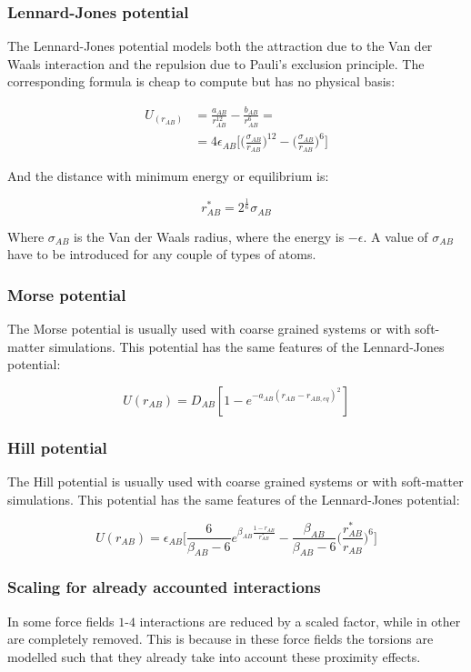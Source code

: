 		\subsubsection{Lennard-Jones potential}
		The Lennard-Jones potential models both the attraction due to the Van der Waals interaction and the repulsion due to Pauli's exclusion principle.
		The corresponding formula is cheap to compute but has no physical basis:

		\begin{align*}
			U_(r_{AB}) &= \frac{a_{AB}}{r^{12}_{AB}}-\frac{b_{AB}}{r^6_{AB}}=\\
								 &= 4\epsilon_{AB}\biggl[\biggl(\frac{\sigma_{AB}}{r_{AB}}\biggr)^{12}-\biggl(\frac{\sigma_{AB}}{r_{AB}}\biggr)^6\biggr]
		\end{align*}

		And the distance with minimum energy or equilibrium is:

		$$r^*_{AB} = 2^{\frac{1}{6}}\sigma_{AB}$$

		Where $\sigma_{AB}$ is the Van der Waals radius, where the energy is $-\epsilon$.
		A value of $\sigma_{AB}$ have to be introduced for any couple of types of atoms.

		\subsubsection{Morse potential}
		The Morse potential is usually used with coarse grained systems or with soft-matter simulations.
		This potential has the same features of the Lennard-Jones potential:

		$$U(r_{AB}) = D_{AB}[1-e^{-a_{AB}(r_{AB}-r_{AB,eq})^2}]$$

		\subsubsection{Hill potential}
		The Hill potential is usually used with coarse grained systems or with soft-matter simulations.
		This potential has the same features of the Lennard-Jones potential:

		$$U(r_{AB}) = \epsilon_{AB}\biggl[\frac{6}{\beta_{AB}-6}e^{\beta_{AB}\frac{1-r_{AB}}{r^*_{AB}}}-\frac{\beta_{AB}}{\beta_{AB}-6}\biggl(\frac{r^*_{AB}}{r_{AB}}\biggr)^6\biggr]$$

		\subsubsection{Scaling for already accounted interactions}
		In some force fields $1$-$4$ interactions are reduced by a scaled factor, while in other are completely removed.
		This is because in these force fields the torsions are modelled such that they already take into account these proximity effects.

